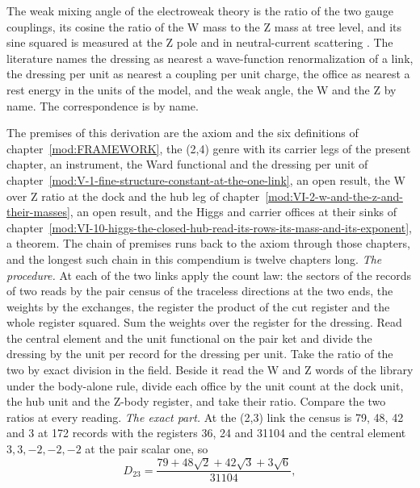 \begin{chbridge}The weak mixing angle of the electroweak theory is the ratio of the two gauge couplings, its cosine the ratio of the W mass to the Z mass at tree level, and its sine squared is measured at the Z pole and in neutral-current scattering \cite{Weinberg1967,Peskin1995}. The literature names the dressing as nearest a wave-function renormalization of a link, the dressing per unit as nearest a coupling per unit charge, the office as nearest a rest energy in the units of the model, and the weak angle, the W and the Z by name. The correspondence is by name.\end{chbridge}
\begin{chproof}
The premises of this derivation are the axiom and the six definitions of chapter~\ref{mod:FRAMEWORK}, the (2,4) genre with its carrier legs of the present chapter, an instrument, the Ward functional and the dressing per unit of chapter~\ref{mod:V-1-fine-structure-constant-at-the-one-link}, an open result, the W over Z ratio at the dock and the hub leg of chapter~\ref{mod:VI-2-w-and-the-z-and-their-masses}, an open result, and the Higgs and carrier offices at their sinks of chapter~\ref{mod:VI-10-higgs-the-closed-hub-read-its-rows-its-mass-and-its-exponent}, a theorem. The chain of premises runs back to the axiom through those chapters, and the longest such chain in this compendium is twelve chapters long.
\textit{The procedure.} At each of the two links apply the count law: the sectors of the records of two reads by the pair census of the traceless directions at the two ends, the weights by the exchanges, the register the product of the cut register and the whole register squared. Sum the weights over the register for the dressing. Read the central element and the unit functional on the pair ket and divide the dressing by the unit per record for the dressing per unit. Take the ratio of the two by exact division in the field. Beside it read the W and Z words of the library under the body-alone rule, divide each office by the unit count at the dock unit, the hub unit and the Z-body register, and take their ratio. Compare the two ratios at every reading.
\textit{The exact part.} At the (2,3) link the census is 79, 48, 42 and 3 at 172 records with the registers 36, 24 and 31104 and the central element $3,3,-2,-2,-2$ at the pair scalar one, so
\begin{equation} D_{23} = \frac{79 + 48\sqrt{2} + 42\sqrt{3} + 3\sqrt{6}}{31104}, \end{equation}

\end{chproof}
